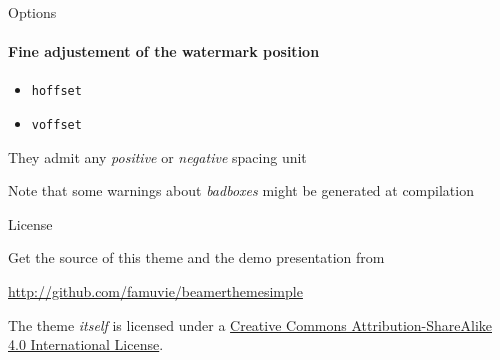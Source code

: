 \documentclass{beamer}
\begin{document}
\setwatermark[hoffset=-3cm,voffset=-2cm]{\fontsize{125pt}{125pt}\selectfont{Simple}}


\begin{frame}{Options}
  \framesubtitle{Fine adjustement of the watermark position}

  
  \begin{itemize}
    \item \texttt{hoffset}
    \item \texttt{voffset}
  \end{itemize}
  
  They admit any \emph{positive} or \emph{negative} spacing \alert{unit}
  
  Note that some \alert{warnings} about \emph{badboxes} might be generated at compilation

\end{frame}




\begin{frame}{License}

  \begin{block}{Get the source of this theme and the demo presentation from}

  \begin{center}\url{http://github.com/famuvie/beamerthemesimple}\end{center}

  \end{block}
  
  The theme \emph{itself} is licensed under a
  \href{http://creativecommons.org/licenses/by-sa/4.0/}{Creative Commons
  Attribution-ShareAlike 4.0 International License}.

  \begin{center}\ccbysa\end{center}

\end{frame}
\end{document}
